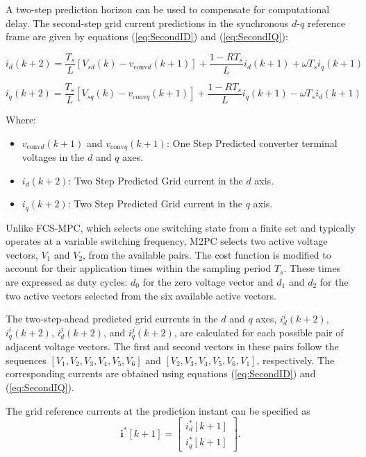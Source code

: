 A two-step prediction horizon can be used to compensate for
computational delay. The second-step grid current predictions in the
synchronous \(d\)-\(q\) reference frame are given by equations
(\ref{eq:SecondID}) and (\ref{eq:SecondIQ}):

\begin{equation}
    i_d(k+2) = \frac{T_s}{L}[V_{sd}(k) - v_{\mathrm{conv}d}(k+1)]
    + \frac{1 - R T_s}{L}i_d(k+1) + \omega T_s i_q(k+1)
    \label{eq:SecondID}
\end{equation}

\begin{equation}
    i_q(k+2) = \frac{T_s}{L}[V_{sq}(k) - v_{\mathrm{conv}q}(k+1)]
    + \frac{1 - R T_s}{L}i_q(k+1) - \omega T_s i_d(k+1)
    \label{eq:SecondIQ}
\end{equation}

\noindent Where:
\begin{itemize}
  \item $v_{\mathrm{conv}d}(k+1)$ and $v_{\mathrm{conv}q}(k+1)$: One Step Predicted converter terminal voltages in the $d$ and $q$ axes.
	\item $i_d(k+2)$: Two Step Predicted Grid current in the $d$ axis.
	\item $i_q(k+2)$: Two Step Predicted Grid current in the  $q$ axis.
\end{itemize}

Unlike FCS-MPC, which selects one switching state from a finite set and
typically operates at a variable switching frequency, M2PC selects two
active voltage vectors, \(V_1\) and \(V_2\), from the available pairs.
The cost function is modified to account for their application times
within the sampling period \(T_s\). These times are expressed as duty
cycles: \(d_0\) for the zero voltage vector and \(d_1\) and \(d_2\)
for the two active vectors selected from the six available active vectors.

The two-step-ahead predicted grid currents in the \(d\) and \(q\) axes,
\(i^{i}_{d}(k+2)\), \(i^{i}_{q}(k+2)\), \(i^{j}_{d}(k+2)\), and
\(i^{j}_{q}(k+2)\), are calculated for each possible pair of adjacent
voltage vectors. The first and second vectors in these pairs follow the
sequences \([V_1,V_2,V_3,V_4,V_5,V_6]\) and
\([V_2,V_3,V_4,V_5,V_6,V_1]\), respectively. The corresponding currents
are obtained using equations (\ref{eq:SecondID}) and
(\ref{eq:SecondIQ}).

The grid reference currents at the prediction instant can be specified as
\begin{equation}
\label{eq:m2pc-target}
\mathbf i^{\ast}[k{+}1]=\begin{bmatrix} i_d^{\ast}[k{+}1]\\[2pt] i_q^{\ast}[k{+}1]\end{bmatrix}.
\end{equation}

